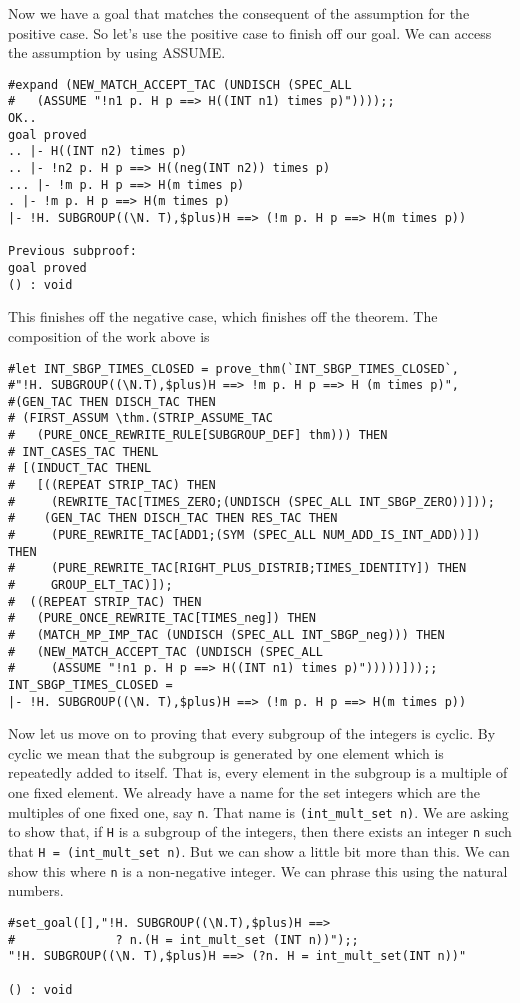 Now we have a goal that matches the consequent of the assumption for
the positive case.  So let's use the positive case to finish off our
goal.  We can access the assumption by using ASSUME.
\begin{session}
\begin{verbatim}
#expand (NEW_MATCH_ACCEPT_TAC (UNDISCH (SPEC_ALL
#   (ASSUME "!n1 p. H p ==> H((INT n1) times p)"))));;
OK..
goal proved
.. |- H((INT n2) times p)
.. |- !n2 p. H p ==> H((neg(INT n2)) times p)
... |- !m p. H p ==> H(m times p)
. |- !m p. H p ==> H(m times p)
|- !H. SUBGROUP((\N. T),$plus)H ==> (!m p. H p ==> H(m times p))

Previous subproof:
goal proved
() : void
\end{verbatim}
\end{session}

This finishes off the negative case, which finishes off the theorem.
The composition of the work above is
\begin{session}
\begin{verbatim}
#let INT_SBGP_TIMES_CLOSED = prove_thm(`INT_SBGP_TIMES_CLOSED`,
#"!H. SUBGROUP((\N.T),$plus)H ==> !m p. H p ==> H (m times p)",
#(GEN_TAC THEN DISCH_TAC THEN
# (FIRST_ASSUM \thm.(STRIP_ASSUME_TAC
#   (PURE_ONCE_REWRITE_RULE[SUBGROUP_DEF] thm))) THEN
# INT_CASES_TAC THENL
# [(INDUCT_TAC THENL
#   [((REPEAT STRIP_TAC) THEN
#     (REWRITE_TAC[TIMES_ZERO;(UNDISCH (SPEC_ALL INT_SBGP_ZERO))]));
#    (GEN_TAC THEN DISCH_TAC THEN RES_TAC THEN
#     (PURE_REWRITE_TAC[ADD1;(SYM (SPEC_ALL NUM_ADD_IS_INT_ADD))]) THEN
#     (PURE_REWRITE_TAC[RIGHT_PLUS_DISTRIB;TIMES_IDENTITY]) THEN
#     GROUP_ELT_TAC)]);
#  ((REPEAT STRIP_TAC) THEN
#   (PURE_ONCE_REWRITE_TAC[TIMES_neg]) THEN
#   (MATCH_MP_IMP_TAC (UNDISCH (SPEC_ALL INT_SBGP_neg))) THEN
#   (NEW_MATCH_ACCEPT_TAC (UNDISCH (SPEC_ALL
#     (ASSUME "!n1 p. H p ==> H((INT n1) times p)")))))]));;
INT_SBGP_TIMES_CLOSED = 
|- !H. SUBGROUP((\N. T),$plus)H ==> (!m p. H p ==> H(m times p))
\end{verbatim}
\end{session}

Now let us move on to proving that every subgroup of the integers is
cyclic.  By cyclic we mean that the subgroup is generated by one
element which is repeatedly added to itself.  That is, every element
in the subgroup is a multiple of one fixed element.  We already have a
name for the set integers which are the multiples of one fixed one,
say {\small\tt n}.  That name is {\small\verb+(int_mult_set n)+}.  We
are asking to show that, if {\small\tt H} is a subgroup of the
integers, then there exists an integer {\small\tt n} such that
{\small\verb+H = (int_mult_set n)+}.  But we can show a little bit
more than this.  We can show this where {\small\tt n} is a
non-negative integer.  We can phrase this using the natural numbers.
\begin{session}
\begin{verbatim}
#set_goal([],"!H. SUBGROUP((\N.T),$plus)H ==>
#              ? n.(H = int_mult_set (INT n))");;
"!H. SUBGROUP((\N. T),$plus)H ==> (?n. H = int_mult_set(INT n))"

() : void
\end{verbatim}
\end{session}

